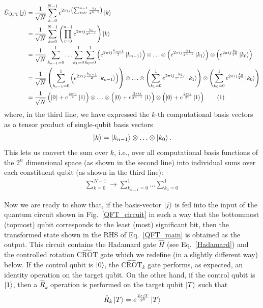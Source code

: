 \documentclass[12pt,oneside]{book}
\newcommand\numberthis{\addtocounter{equation}{1}\tag{\theequation}}
\begin{document}
\begin{align*}\label{QFT_main}
    \hat{U}_\mathrm{QFT}\ket{j} &{}= \frac{1}{\sqrt{N}} \sum_{k=0}^{N-1} e^{2\pi ij \left( \sum_{t=0}^{n-1} \frac{k_t}{2^{n-t}} \right)}\ket{k}\\
    &{} = \frac{1}{\sqrt{N}} \sum_{k=0}^{N-1} \left(\prod_{t=0}^{n-1} e^{2\pi ij \frac{k_t}{2^{n-t}}}\right) \ket{k}\\
    &{} = \frac{1}{\sqrt{N}} \sum_{k_{n-1}=0}^1 \hdots \sum_{k_1=0}^1\sum_{k_0=0}^1 \left( e^{2\pi ij \frac{k_{n-1}}{2}} \ket{k_{n-1}}\right)\otimes \hdots \otimes \left( e^{2\pi ij \frac{k_1}{2^{n-1}}} \ket{k_1}\right) \otimes \left( e^{2\pi ij \frac{k_0}{2^n}} \ket{k_0}\right)\\
    &{} = \frac{1}{\sqrt{N}} \left(\sum_{k_{n-1}=0}^1 \left( e^{2\pi ij \frac{k_{n-1}}{2}} \ket{k_{n-1}}\right) \right) \otimes \hdots \otimes \left(\sum_{k_1=0}^1 e^{2\pi ij \frac{k_1}{2^{n-1}}} \ket{k_1}\right) \otimes \left(\sum_{k_0=0}^1 e^{2\pi ij \frac{k_0}{2^n}} \ket{k_0}\right)\\
    &{} = \frac{1}{\sqrt{N}} \left(\ket{0} + e^{\frac{2\pi ij}{2}}\ket{1}\right) \otimes \hdots \otimes \left( \ket{0} + e^{\frac{2\pi i j}{2^{n-1}}}\ket{1} \right)\otimes \left(\ket{0}+e^{\frac{2\pi i j}{2^n}}\ket{1}\right)\numberthis
\end{align*}
where, in the third line, we have expressed the $k$-th computational basis vectors as a tensor product of single-qubit basis vectors $$\ket{k}=\ket{k_{n-1}}\otimes\hdots\otimes\ket{k_0}.$$ This lets us convert the sum over $k$, i.e., over all computational basis functions of the $2^n$ dimensional space (as shown in the second line) into individual sums over each constituent qubit (as shown in the third line):
\begin{align*}
    \sum_{k=0}^{N-1} \rightarrow \sum_{k_{n-1}=0}^1 \hdots \sum_{k_0=0}^1
\end{align*}

Now we are ready to show that, if the basis-vector $\ket{j}$ is fed into the input of the quantum circuit shown in Fig.~\ref{QFT_circuit} in such a way that the bottommost (topmost) qubit corresponds to the least (most) significant bit, then the transformed state shown in the RHS of Eq.~\ref{QFT_main} is obtained as the output. This circuit contains the Hadamard gate $\hat{H}$ (see Eq.~\ref{Hadamard}) and the controlled rotation $\hat{\mathrm{CROT}}$ gate which we redefine (in a slightly different way) below. If the control qubit is $\ket{0}$, the $\hat{\mathrm{CROT}}_k$ gate performs, as expected, an identity operation on the target qubit. On the other hand, if the control qubit is $\ket{1}$, then a $\hat{R}_k$ operation is performed on the target qubit $\ket{T}$ such that
\begin{align*}
\hat{R}_k\ket{T}=e^{\frac{2\pi i T}{2^k}}\ket{T}
\end{align*}
\end{document}

